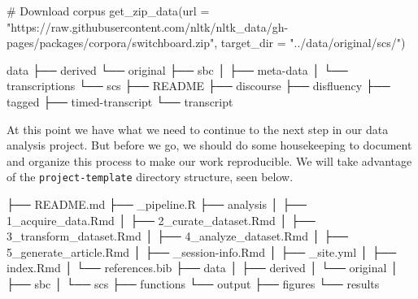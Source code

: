 \documentclass[
  letterpaper,
]{latex/krantz}
\newenvironment{Shaded}{\begin{snugshade}}{\end{snugshade}}
\newcommand{\AttributeTok}[1]{\textcolor[rgb]{0.40,0.45,0.13}{#1}}
\newcommand{\CommentTok}[1]{\textcolor[rgb]{0.37,0.37,0.37}{#1}}
\newcommand{\ExtensionTok}[1]{\textcolor[rgb]{0.00,0.23,0.31}{#1}}
\newcommand{\FunctionTok}[1]{\textcolor[rgb]{0.28,0.35,0.67}{#1}}
\newcommand{\NormalTok}[1]{\textcolor[rgb]{0.00,0.23,0.31}{#1}}
\newcommand{\StringTok}[1]{\textcolor[rgb]{0.13,0.47,0.30}{#1}}
\begin{document}
\begin{Shaded}
\begin{Highlighting}[]
\CommentTok{\# Download corpus}
\FunctionTok{get\_zip\_data}\NormalTok{(}\AttributeTok{url =} \StringTok{"https://raw.githubusercontent.com/nltk/nltk\_data/gh{-}pages/packages/corpora/switchboard.zip"}\NormalTok{, }\AttributeTok{target\_dir =} \StringTok{"../data/original/scs/"}\NormalTok{)}
\end{Highlighting}
\end{Shaded}

\begin{Shaded}
\begin{Highlighting}[]
\ExtensionTok{data}
\ExtensionTok{├──}\NormalTok{ derived}
\ExtensionTok{└──}\NormalTok{ original}
    \ExtensionTok{├──}\NormalTok{ sbc}
    \ExtensionTok{│}\NormalTok{   ├── meta{-}data}
    \ExtensionTok{│}\NormalTok{   └── transcriptions}
    \ExtensionTok{└──}\NormalTok{ scs}
        \ExtensionTok{├──}\NormalTok{ README}
        \ExtensionTok{├──}\NormalTok{ discourse}
        \ExtensionTok{├──}\NormalTok{ disfluency}
        \ExtensionTok{├──}\NormalTok{ tagged}
        \ExtensionTok{├──}\NormalTok{ timed{-}transcript}
        \ExtensionTok{└──}\NormalTok{ transcript}
\end{Highlighting}
\end{Shaded}

At this point we have what we need to continue to the next step in our
data analysis project. But before we go, we should do some housekeeping
to document and organize this process to make our work reproducible. We
will take advantage of the \texttt{project-template} directory
structure, seen below.

\begin{Shaded}
\begin{Highlighting}[]
\ExtensionTok{├──}\NormalTok{ README.md}
\ExtensionTok{├──}\NormalTok{ \_pipeline.R}
\ExtensionTok{├──}\NormalTok{ analysis}
\ExtensionTok{│}\NormalTok{   ├── 1\_acquire\_data.Rmd}
\ExtensionTok{│}\NormalTok{   ├── 2\_curate\_dataset.Rmd}
\ExtensionTok{│}\NormalTok{   ├── 3\_transform\_dataset.Rmd}
\ExtensionTok{│}\NormalTok{   ├── 4\_analyze\_dataset.Rmd}
\ExtensionTok{│}\NormalTok{   ├── 5\_generate\_article.Rmd}
\ExtensionTok{│}\NormalTok{   ├── \_session{-}info.Rmd}
\ExtensionTok{│}\NormalTok{   ├── \_site.yml}
\ExtensionTok{│}\NormalTok{   ├── index.Rmd}
\ExtensionTok{│}\NormalTok{   └── references.bib}
\ExtensionTok{├──}\NormalTok{ data}
\ExtensionTok{│}\NormalTok{   ├── derived}
\ExtensionTok{│}\NormalTok{   └── original}
\ExtensionTok{│}\NormalTok{       ├── sbc}
\ExtensionTok{│}\NormalTok{       └── scs}
\ExtensionTok{├──}\NormalTok{ functions}
\ExtensionTok{└──}\NormalTok{ output}
    \ExtensionTok{├──}\NormalTok{ figures}
    \ExtensionTok{└──}\NormalTok{ results}
\end{Highlighting}
\end{Shaded}
\end{document}
